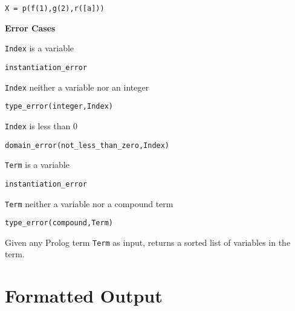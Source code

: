 \begin{description}
{\begin{verbatim}
X = p(f(1),g(2),r([a]))
\end{verbatim}
}

{\bf Error Cases} 
\bi
\item 	{\tt Index} is a variable
\bi
\item    {\tt instantiation\_error}
\ei
\item 	{\tt Index} neither a variable nor an integer
\bi
\item    {\tt type\_error(integer,Index)}
\ei
\item 	{\tt Index} is less than 0
\bi
\item    {\tt domain\_error(not\_less\_than\_zero,Index)}
\ei
\item 	{\tt Term} is a variable
\bi
\item    {\tt instantiation\_error}
\ei
\item 	{\tt Term} neither a variable nor a compound term
\bi
\item    {\tt type\_error(compound,Term)}
\ei
\ei

% 
Given any Prolog term {\tt Term} as input, returns a sorted list of
variables in the term.  
\end{description}

\section{Formatted Output}

